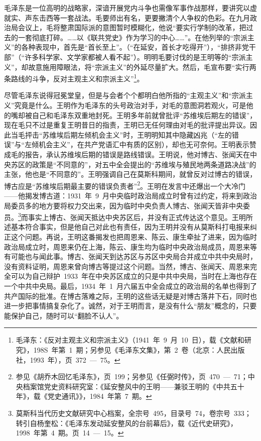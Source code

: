 毛泽东是一位高明的战略家，深谙开展党内斗争也需像军事作战那样，要讲究以虚就实、声东击西等一套战法。毛要师出有名，更要撇清个人争权的色彩。在九月政治局会议上，毛将整肃国际派的意图暂时模糊化，他说“要实行学制的改革，把过去的一套彻底打碎。……以《联共党史》作为学习的中心……”。在他列举的“宗派主义”的各种表现中，首先是“首长至上”。（“在延安，首长才吃得开”），“排挤非党干部”（“许多科学家、文学家都被人看不起”）。明明毛要讨伐的是王明等的“宗派主义”，却故意施用障眼法，将“宗派主义”的外延尽量扩大。然后，毛宣布要“实行两条路线的斗争，反对主观主义和宗派主义”\footnote{毛泽东：《反对主观主义和宗派主义》（1941~年~9~月~10~日），载《文献和研究》，198S~年第~1~期；另参见《毛泽东文集》，第~2~卷（北京：人民出版社，1993~年），页~372~—~75。}。

尽管毛泽东说得冠冕堂皇，但是与会者个个都明白他所指的“主观主义”和“宗派主义”究竟是什么。王明作为毛泽东的头号政治对手，对毛的意图洞若观火，可是他的嘴却被自己和毛泽东双重地封死。王明多年前就曾批评“苏维埃后期左的错误”，现在毛只不过是重复王明昔日的指责，王明已无任何理由对毛的批评提出异议。因此当毛抨击“苏维埃后期左倾机会主义”时，王明明知其中隐藏凶兆（“左的错误”与“左倾机会主义”，在共产党语汇中有质的区别），却也无可奈何。王明表示赞成毛的报告，承认苏维埃后期的错误是路线错误。王明说，他对博古、张闻天在中央苏区的政策是“不同意的”，对五中全会提出的“苏维埃与殖民地两条道路决战”的主张，他也是“不同意的”。王明强调自己在莫斯科期间，就曾反对过博古的错误，博古应是“苏维埃后期最主要的错误负责者”\footnote{参见《胡乔木回忆毛泽东》，页~199；另参见《任弼时传》，页~470~—~71；中央档案馆党史资料研究室：《延安整风中的王明——兼驳王明的《中共五十年》，载《党史通讯》》，1984~年第~7~期。}。王明在发言中还爆出一个大冷门——他揭发博古道：1931~年~9~月中央临时政治局成立时曾有过约定，将来到政治局委员多的地方要将权力交出来，因为临时中央负责人博古、张闻天皆非中央委员。\footnote{莫斯科当代历史文献研究中心档案，全宗号~495，目录号~74，卷宗号~333；转引自杨奎松：《毛泽东发动延安整风的台前幕后》，载《近代史研究》，1998~年第~4~期。页~14~—~15。}而事实上博古、张闻天抵达中央苏区后，并没有正式传达这个意见。王明所述基本符合事实，但是他自己对此也有责任，因为王明并没有从莫斯科打电报来纠正这个问题。再说，王明这番揭发也把周恩来、陈云、康生牵扯了进来，因为临时政治局成立时，周恩来仍在上海，陈云、康生均为临时中央政治局成员，周恩来等有可能也与闻此事。博古、张闻天到达苏区与苏区中央局合并成立中共中央局时，没有资料证明，周恩来曾向博古等提过这个问题。当然，博古、张闻天、周恩来完全可以为自己辩护~1933~年在中央苏区成立的只是中共中央局，当时在上海也存在一个中共中央局。最后，1934~年~1~月六届五中全会成立的政治局的名单也得到了共产国际的批准。在博古落难之际，王明的这些话无疑是对博古落井下石，同时也进一步把事情搞复杂化了。诚然，对于王明而言，是没有什么“朋友”概念的，只要能保护自己，随时可以“翻脸不认人”。


